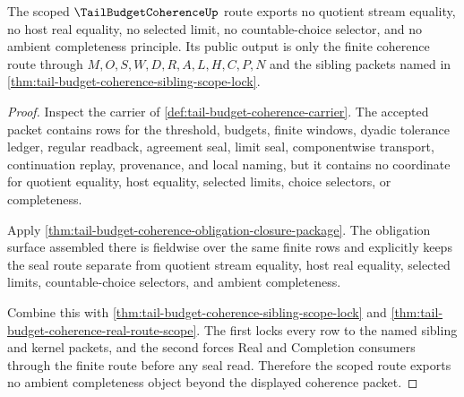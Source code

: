 \begin{theorem}
\label{thm:tail-budget-coherence-no-ambient-completeness-scope}
The scoped $\TailBudgetCoherenceUp$ route exports no quotient stream equality, no host real equality, no selected limit, no countable-choice selector, and no ambient completeness principle. Its public output is only the finite coherence route through $M,O,S,W,D,R,A,L,H,C,P,N$ and the sibling packets named in \autoref{thm:tail-budget-coherence-sibling-scope-lock}.
\end{theorem}
\begin{proof}
Inspect the carrier of \autoref{def:tail-budget-coherence-carrier}. The accepted packet contains rows for the threshold, budgets, finite windows, dyadic tolerance ledger, regular readback, agreement seal, limit seal, componentwise transport, continuation replay, provenance, and local naming, but it contains no coordinate for quotient equality, host equality, selected limits, choice selectors, or completeness.

Apply \autoref{thm:tail-budget-coherence-obligation-closure-package}. The obligation surface assembled there is fieldwise over the same finite rows and explicitly keeps the seal route separate from quotient stream equality, host real equality, selected limits, countable-choice selectors, and ambient completeness.

Combine this with \autoref{thm:tail-budget-coherence-sibling-scope-lock} and \autoref{thm:tail-budget-coherence-real-route-scope}. The first locks every row to the named sibling and kernel packets, and the second forces Real and Completion consumers through the finite route before any seal read. Therefore the scoped route exports no ambient completeness object beyond the displayed coherence packet.
\end{proof}

